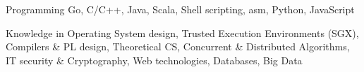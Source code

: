 


\begin{cvskills}


\cvskill
{Programming} %
{Go, C/C++, Java, Scala, Shell scripting, asm, Python, JavaScript} %

\cvskill
{}{}

\cvskill
{Knowledge in} %
{Operating System design, Trusted Execution Environments (SGX), Compilers \&
PL design, Theoretical CS,
Concurrent \& Distributed Algorithms, IT security \& Cryptography, Web technologies, Databases, Big Data} %

\end{cvskills}
